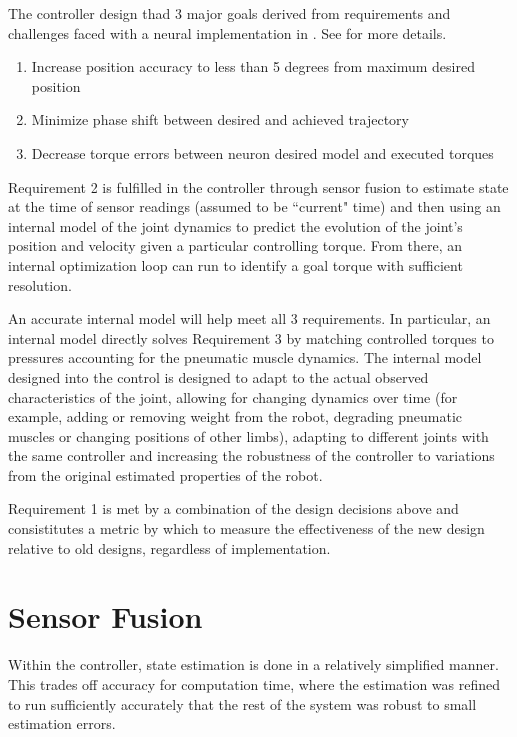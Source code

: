 The controller design thad 3 major goals derived from
requirements and challenges faced with a neural implementation in
\cite{HuntPhDThesis}. See  for more details.

\begin{enumerate}
\item Increase position accuracy to less than 5 degrees from maximum desired
position
\item Minimize phase shift between desired and achieved trajectory
\item Decrease torque errors between neuron desired model and executed torques
\end{enumerate}

Requirement 2 is fulfilled in
the controller through sensor fusion to estimate state at the time of sensor
readings (assumed to be ``current" time) and then using an internal model of the
joint dynamics to predict the evolution of the joint's position and velocity
given a particular controlling torque. From there, an internal optimization loop
can run to identify a goal torque with sufficient resolution.

An accurate internal model will help meet all 3 requirements. In particular, an
internal model directly solves Requirement 3 by matching controlled torques to
pressures accounting for the pneumatic muscle dynamics. The internal model
designed into the control is designed to adapt to the actual observed
characteristics of the joint, allowing for changing dynamics over time (for
example, adding or removing weight from the robot, degrading pneumatic muscles
or changing positions of other limbs),
adapting to different joints with the same controller and increasing the
robustness of the controller to variations from the original estimated
properties of the robot.

Requirement 1 is met by a combination of the design decisions above and
consistitutes a metric by which to measure the effectiveness of the new design
relative to old designs, regardless of implementation.

\section{Sensor Fusion}

Within the controller, state estimation is done in a relatively simplified
manner. This trades off accuracy for computation time, where the estimation was
refined to run sufficiently accurately that the rest of the system was robust to
small estimation errors.


